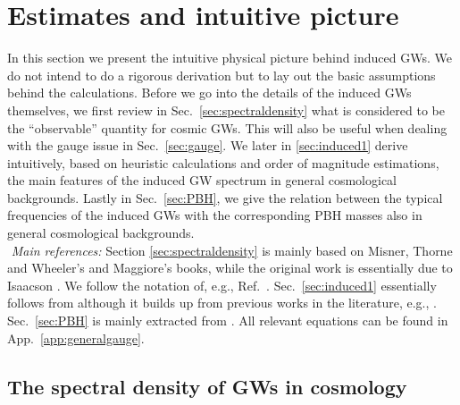 \documentclass[a4paper,11pt]{article}
\numberwithin{equation}{section}
\begin{document}

\section{Estimates and intuitive picture \label{sec:estimates}}

In this section we present the intuitive physical picture behind induced GWs. We do not intend to do a rigorous derivation but to lay out the basic assumptions behind the calculations. Before we go into the details of the induced GWs themselves, we first review in Sec.~\ref{sec:spectraldensity} what is considered to be the ``observable'' quantity for cosmic GWs. This will also be useful when dealing with the gauge issue in Sec.~\ref{sec:gauge}. We later in \ref{sec:induced1} derive intuitively, based on heuristic calculations and order of magnitude estimations, the main features of the induced GW spectrum in general cosmological backgrounds. Lastly in Sec.~\ref{sec:PBH}, we give the relation between the typical frequencies of the induced GWs with the corresponding PBH masses also in general cosmological backgrounds.\\

\noindent\faBook\,\,\textit{Main references:} Section \ref{sec:spectraldensity} is mainly based on Misner, Thorne and Wheeler's \cite{Misner:1974qy} and Maggiore's \cite{Maggiore:1900zz} books, while the original work is essentially due to Isaacson \cite{Isaacson:1967zz,Isaacson:1968zza}. We follow the notation of, e.g., Ref.~\cite{Cai:2019cdl,Domenech:2020xin}. Sec.~\ref{sec:induced1} essentially follows from \cite{Domenech:2020kqm} although it builds up from previous works in the literature, e.g., \cite{Baumann:2007zm,Kohri:2018awv,Cai:2019cdl,Domenech:2019quo}. Sec.~\ref{sec:PBH} is mainly extracted from \cite{Sasaki:2018dmp,Domenech:2019quo,Domenech:2020ers}. All relevant equations can be found in App.~\ref{app:generalgauge}.


\subsection{The spectral density of GWs in cosmology\label{sec:spectraldensity}}
\end{document}
